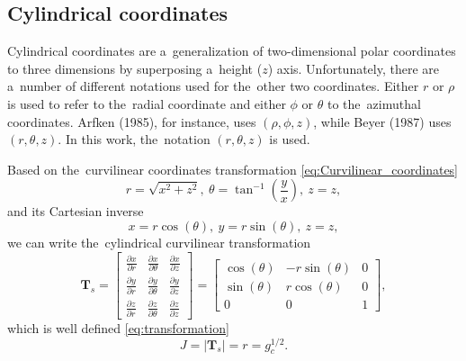 \documentclass[review]{elsarticle}
\newcommand{\pdv}[2]{\frac{\partial{#1}}{\partial{#2}}}
\newcommand{\matr}[1]{\mathbf{#1}}
\begin{document}
\subsection{Cylindrical coordinates}
Cylindrical coordinates are a~generalization of two-dimensional polar 
coordinates to three dimensions by superposing a~height ($z$) axis. 
Unfortunately, there are a~number of different notations used for 
the~other two coordinates. Either  $r$ or $\rho$ is used to refer to 
the~radial coordinate and either $\phi$ or $\theta$ to the~azimuthal 
coordinates. Arfken (1985), for instance, uses $(\rho,\phi,z)$, 
while Beyer (1987) uses $(r,\theta,z)$. 
In this work, the~notation $(r,\theta,z)$ is used.

Based on the~curvilinear coordinates transformation 
\eqref{eq:Curvilinear_coordinates}
\begin{equation}
  r = \sqrt{x^2 + z^2} ,~ 
  \theta = \tan^{-1}\left( \frac{y}{x} \right) ,~ 
  z = z,
  \label{eq:cyl_curvilinear_transformation}
\end{equation}
and its Cartesian inverse
\begin{equation}
  x = r \cos(\theta) ,~ 
  y = r \sin(\theta) ,~ 
  z = z,
  \label{eq:cyl_Cartesian_transformation}
\end{equation}
we can write the~cylindrical curvilinear transformation
\begin{equation}
  \matr{T}_{s} = \begin{bmatrix}
        \pdv{x}{r} & \pdv{x}{\theta} & \pdv{x}{z} \\
        \pdv{y}{r} & \pdv{y}{\theta} & \pdv{y}{z} \\
        \pdv{z}{r} & \pdv{z}{\theta} & \pdv{z}{z} 
	  \end{bmatrix}
  = \begin{bmatrix}
  \cos(\theta) & -r\sin(\theta) & 0 \\
  \sin(\theta) & r\cos(\theta) & 0 \\
  0 & 0 & 1
  \end{bmatrix} ,
  \label{eq:cyl_transformation}
\end{equation}
which is well defined \eqref{eq:transformation}
\begin{equation}
  J = |\matr{T}_{s}| = r = g_c^{1/2}.
  \label{eq:cyl_J}
\end{equation}
\end{document}

